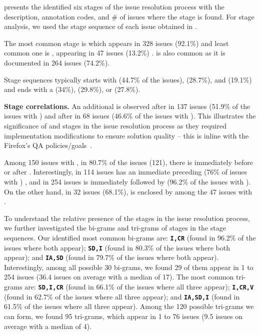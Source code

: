  presents the identified six stages of the issue resolution process with the description, annotation codes, and \# of issues where the stage is found. For stage analysis, we used the stage sequence of each issue obtained in . 

The most common stage is \impl which appears in 328 issues (92.1\%) and least common one is \ir, appearing in 47 issues (13.2\%) . \crv is also common as it is documented in 264 issues (74.2\%). 

Stage sequences typically starts with \impl (44.7\% of the issues), \ia (28.7\%), and \sd (19.1\%) and ends with a \crv (34\%), \impl (29.8\%), or \ver (27.8\%). 


\textbf{Stage correlations.}
An additional 
\impl is observed after \crv in 137 issues (51.9\% of the issues with \crv) and after \ver in 68 issues (46.6\% of the issues with \ver). This illustrates the significance of \crv and \ver stages in the issue resolution process as they required implementation modifications to ensure solution quality -- this is inline with the Firefox's QA policies/goals~\cite{firefox-qa}.

 Among 150 issues with \sd, in 80.7\% of the issues (121), there is \impl immediately before or after \sd. Interestingly, in 114 issues \impl has an immediate preceding \sd (76\% of issues with \sd) , and in 254 issues \impl is immediately followed by \crv (96.2\% of the issues with \crv). On the other hand, in 32 issues (68.1\%), \ir is enclosed by \ia among the 47 issues with \ir. 

To understand the relative presence of the stages in the issue resolution process, we further investigated the bi-grams and tri-grams of stages in the stage sequences. Our identified most common bi-grams are: \texttt{\textbf{I,CR}} (found in 96.2\% of the issues where both appear); \texttt{\textbf{SD,I}} (found in 80.3\% of the issues where both appear); and \texttt{\textbf{IA,SD}} (found in 79.7\% of the issues where both appear). Interestingly, among all possible 30 bi-grams, we found 29 of them appear in 1 to 254 issues (36.4 issues on average with a median of 17). 
The most common tri-grams are: \texttt{\textbf{SD,I,CR}} (found in 66.1\% of the issues where all three appear); \texttt{\textbf{I,CR,V}} (found in 62.7\% of the issues where all three appear); and \texttt{\textbf{IA,SD,I}} (found in 61.5\% of the issues where all three appear). Among the 120 possible tri-grams we can form, we found 95 tri-grams, which appear in 1 to 76 issues (9.5 issues on average with a median of 4).



